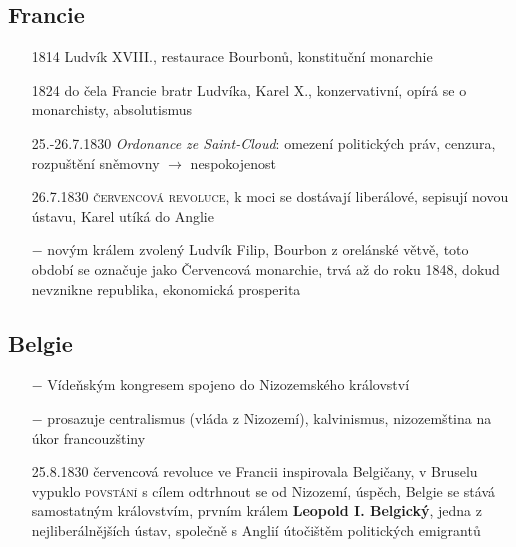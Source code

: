 \documentclass{article}
\begin{document}
\subsection*{Francie}
\begin{itemize}
    \vspace{-0.5em}
    \setlength\itemsep{0.15em}
    \item[1814] Ludvík XVIII., restaurace Bourbonů, konstituční monarchie
    \item[1824] do čela Francie bratr Ludvíka, Karel X., konzervativní, opírá se o monarchisty, absolutismus
    \item[25.-26.7.1830] \textit{Ordonance ze Saint-Cloud}: omezení politických práv, cenzura,  rozpuštění sněmovny $\rightarrow$ nespokojenost
    \item[26.7.1830] \textsc{červencová revoluce}, k moci se dostávají liberálové, sepisují novou ústavu, Karel utíká do Anglie
    \item[$-$] novým králem zvolený Ludvík Filip, Bourbon z orelánské větvě, toto období se označuje jako Červencová monarchie, trvá až do roku 1848, dokud nevznikne republika, ekonomická prosperita
\end{itemize}

\subsection*{Belgie}
\begin{itemize}
    \vspace{-0.5em}
    \setlength\itemsep{0.15em}
    \item[$-$] Vídeňským kongresem spojeno do Nizozemského království
    \item[$-$] prosazuje centralismus (vláda z Nizozemí), kalvinismus, nizozemština na úkor francouzštiny
    \item[25.8.1830] červencová revoluce ve Francii inspirovala Belgičany, v Bruselu vypuklo \textsc{povstání} s cílem odtrhnout se od Nizozemí, úspěch, Belgie se stává samostatným královstvím, prvním králem \textbf{Leopold I. Belgický}, jedna z nejliberálnějších ústav, společně s Anglií útočištěm politických emigrantů
\end{itemize}
\end{document}
